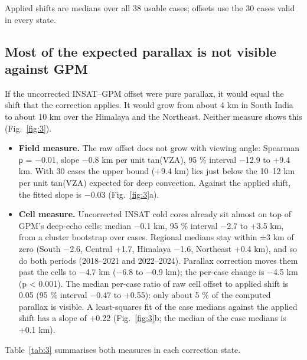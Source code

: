 Applied shifts are medians over all 38 usable cases; offsets use the 30 cases valid in every state.

\subsection{Most of the expected parallax is not visible against GPM}\label{sec:5.5}

If the uncorrected INSAT--GPM offset were pure parallax, it would equal the shift that the correction applies. It would grow from about 4 km in South India to about 10 km over the Himalaya and the Northeast. Neither measure shows this (Fig.~\ref{fig:3}).

\begin{itemize}
\tightlist
\item
  \textbf{Field measure.} The raw offset does not grow with viewing angle: Spearman ρ = −0.01, slope −0.8 km per unit tan(VZA), 95 \% interval −12.9 to +9.4 km. With 30 cases the upper bound (+9.4 km) lies just below the 10--12 km per unit tan(VZA) expected for deep convection. Against the applied shift, the fitted slope is −0.03 (Fig.~\ref{fig:3}a).
\item
  \textbf{Cell measure.} Uncorrected INSAT cold cores already sit almost on top of GPM's deep-echo cells: median −0.1 km, 95 \% interval −2.7 to +3.5 km, from a cluster bootstrap over cases. Regional medians stay within ±3 km of zero (South −2.6, Central +1.7, Himalaya −1.6, Northeast +0.4 km), and so do both periods (2018--2021 and 2022--2024). Parallax correction moves them past the cells to −4.7 km (−6.8 to −0.9 km); the per-case change is −4.5 km (p \textless{} 0.001). The median per-case ratio of raw cell offset to applied shift is 0.05 (95 \% interval −0.47 to +0.55): only about 5 \% of the computed parallax is visible. A least-squares fit of the case medians against the applied shift has a slope of +0.22 (Fig.~\ref{fig:3}b; the median of the case medians is +0.1 km).
\end{itemize}

Table~\ref{tab:3} summarises both measures in each correction state.

